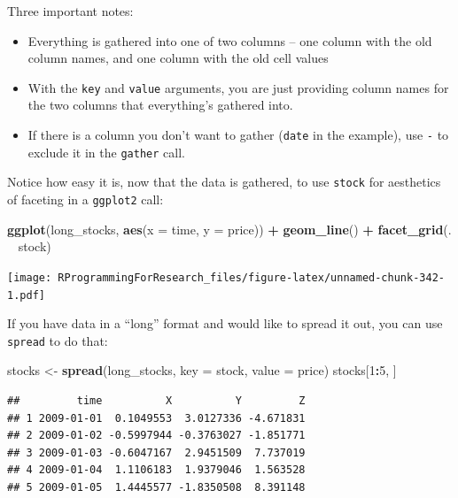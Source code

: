 \documentclass[]{book}
\makeatletter
\newenvironment{Shaded}{\begin{snugshade}}{\end{snugshade}}
\newcommand{\KeywordTok}[1]{\textcolor[rgb]{0.13,0.29,0.53}{\textbf{#1}}}
\newcommand{\DataTypeTok}[1]{\textcolor[rgb]{0.13,0.29,0.53}{#1}}
\newcommand{\DecValTok}[1]{\textcolor[rgb]{0.00,0.00,0.81}{#1}}
\newcommand{\StringTok}[1]{\textcolor[rgb]{0.31,0.60,0.02}{#1}}
\newcommand{\OperatorTok}[1]{\textcolor[rgb]{0.81,0.36,0.00}{\textbf{#1}}}
\newcommand{\NormalTok}[1]{#1}
\providecommand{\tightlist}{%
  \setlength{\itemsep}{0pt}\setlength{\parskip}{0pt}}
\newenvironment{kframe}{%
\medskip{}
\setlength{\fboxsep}{.8em}
 \def\at@end@of@kframe{}%
 \ifinner\ifhmode%
  \def\at@end@of@kframe{\end{minipage}}%
  \begin{minipage}{\columnwidth}%
 \fi\fi%
 \def\FrameCommand##1{\hskip\@totalleftmargin \hskip-\fboxsep
 \colorbox{shadecolor}{##1}\hskip-\fboxsep
     \hskip-\linewidth \hskip-\@totalleftmargin \hskip\columnwidth}%
 \MakeFramed {\advance\hsize-\width
   \@totalleftmargin\z@ \linewidth\hsize
   \@setminipage}}%
 {\par\unskip\endMakeFramed%
 \at@end@of@kframe}
\renewenvironment{Shaded}{\begin{kframe}}{\end{kframe}}
\theoremstyle{definition}
\theoremstyle{definition}
\theoremstyle{definition}
\theoremstyle{remark}
\makeatother
\begin{document}
Three important notes:

\begin{itemize}
\tightlist
\item
  Everything is gathered into one of two columns -- one column with the
  old column names, and one column with the old cell values
\item
  With the \texttt{key} and \texttt{value} arguments, you are just
  providing column names for the two columns that everything's gathered
  into.
\item
  If there is a column you don't want to gather (\texttt{date} in the
  example), use \texttt{-} to exclude it in the \texttt{gather} call.
\end{itemize}

Notice how easy it is, now that the data is gathered, to use
\texttt{stock} for aesthetics of faceting in a \texttt{ggplot2} call:

\begin{Shaded}
\begin{Highlighting}[]
\KeywordTok{ggplot}\NormalTok{(long_stocks, }\KeywordTok{aes}\NormalTok{(}\DataTypeTok{x =}\NormalTok{ time, }\DataTypeTok{y =}\NormalTok{ price)) }\OperatorTok{+}\StringTok{ }
\StringTok{  }\KeywordTok{geom_line}\NormalTok{() }\OperatorTok{+}\StringTok{ }
\StringTok{  }\KeywordTok{facet_grid}\NormalTok{(. }\OperatorTok{~}\StringTok{ }\NormalTok{stock)}
\end{Highlighting}
\end{Shaded}

\texttt{[image: RProgrammingForResearch\_files/figure-latex/unnamed-chunk-342-1.pdf]}

If you have data in a ``long'' format and would like to spread it out,
you can use \texttt{spread} to do that:

\begin{Shaded}
\begin{Highlighting}[]
\NormalTok{stocks <-}\StringTok{ }\KeywordTok{spread}\NormalTok{(long_stocks, }\DataTypeTok{key =}\NormalTok{ stock, }\DataTypeTok{value =}\NormalTok{ price)}
\NormalTok{stocks[}\DecValTok{1}\OperatorTok{:}\DecValTok{5}\NormalTok{, ]}
\end{Highlighting}
\end{Shaded}

\begin{verbatim}
##         time          X          Y         Z
## 1 2009-01-01  0.1049553  3.0127336 -4.671831
## 2 2009-01-02 -0.5997944 -0.3763027 -1.851771
## 3 2009-01-03 -0.6047167  2.9451509  7.737019
## 4 2009-01-04  1.1106183  1.9379046  1.563528
## 5 2009-01-05  1.4445577 -1.8350508  8.391148
\end{verbatim}
\end{document}
